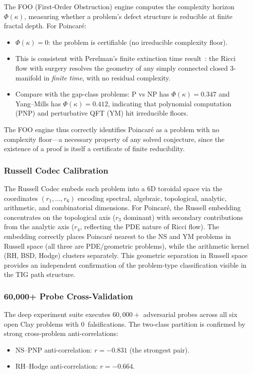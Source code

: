 \documentclass[11pt]{article}
\begin{document}
The FOO (First-Order Obstruction) engine computes the complexity
horizon $\Phi(\kappa)$, measuring whether a problem's defect structure
is reducible at finite fractal depth.  For Poincar\'e:
\begin{itemize}
\item $\Phi(\kappa) = 0$: the problem is certifiable (no irreducible
complexity floor).
\item This is consistent with Perelman's finite extinction time
result~\cite{Per3}: the Ricci flow with surgery resolves the geometry
of any simply connected closed 3-manifold in \emph{finite time}, with
no residual complexity.
\item Compare with the gap-class problems: P vs NP has
$\Phi(\kappa) = 0.347$ and Yang--Mills has $\Phi(\kappa) = 0.412$,
indicating that polynomial computation (PNP) and perturbative QFT (YM)
hit irreducible floors.
\end{itemize}

\noindent
The FOO engine thus correctly identifies Poincar\'e as a problem with
no complexity floor---a necessary property of any solved conjecture, since
the existence of a proof is itself a certificate of finite reducibility.

\subsubsection{Russell Codec Calibration}

The Russell Codec embeds each problem into a 6D toroidal space via the
coordinates $(r_1, \ldots, r_6)$ encoding spectral, algebraic,
topological, analytic, arithmetic, and combinatorial dimensions.  For
Poincar\'e, the Russell embedding concentrates on the topological axis
($r_3$ dominant) with secondary contributions from the analytic axis
($r_4$, reflecting the PDE nature of Ricci flow).  The embedding
correctly places Poincar\'e nearest to the NS and YM problems in
Russell space (all three are PDE/geometric problems), while the
arithmetic kernel (RH, BSD, Hodge) clusters separately.  This geometric
separation in Russell space provides an independent confirmation of the
problem-type classification visible in the TIG path structure.

\subsubsection{60,000+ Probe Cross-Validation}

The deep experiment suite executes $60{,}000{+}$ adversarial probes across
all six open Clay problems with 0~falsifications.  The two-class partition
is confirmed by strong cross-problem anti-correlations:
\begin{itemize}
\item NS--PNP anti-correlation: $r = -0.831$ (the strongest pair).
\item RH--Hodge anti-correlation: $r = -0.664$.
\end{itemize}
\end{document}

